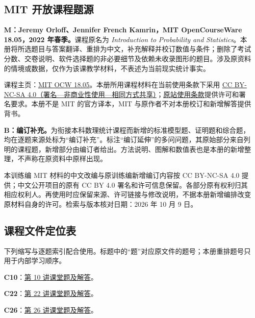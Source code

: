 \documentclass[UTF8,12pt,a4paper,fontset=fandol]{ctexbook}
\begin{document}
\subsection*{MIT 开放课程题源}
\textbf{M：Jeremy Orloff、Jennifer French Kamrin，MIT OpenCourseWare 18.05，2022 年春季。}课程原名为 \emph{Introduction to Probability and Statistics}。本册将所选题目与答案翻译、重排为中文，补充解释并校订数值与条件；删除了考试分数、交卷说明、软件选择题的非必要细节及依赖未收录图形的题目。涉及原资料的情境或数据，仅作为该课教学材料，不表述为当前现实统计事实。

课程主页：\href{https://ocw.mit.edu/courses/18-05-introduction-to-probability-and-statistics-spring-2022/}{MIT OCW 18.05}。本册所用课程材料在当前使用条款下采用 \href{https://creativecommons.org/licenses/by-nc-sa/4.0/}{CC BY-NC-SA 4.0（署名—非商业性使用—相同方式共享）}；\href{https://ocw.mit.edu/pages/privacy-and-terms-of-use/}{原站使用条款}提供许可和署名要求。本册不是 MIT 的官方译本，MIT 与原作者不对本册校订和新增解答提供背书。

\textbf{B：编订补充。}为衔接本科数理统计课程而新增的标准模型题、证明题和综合题，均在逐题来源处标为“编订补充”。标注“编订延伸”的多问问题，其原始部分来自列明的课程题，新增部分由编订者给出。方法说明、图解和数值表也是本册的新增整理，不声称在原资料中原样出现。

本训练编 MIT 材料的中文改编与原训练编新增编订内容按 CC BY-NC-SA 4.0 提供；中文公开项目的原有 CC BY 4.0 署名和许可信息保留。各部分原有权利归其相应权利人。再使用时应保留来源、许可链接与修改说明，不据本册新增编排改变原材料自身的许可。检索与版本核对日期：2026 年 10 月 9 日。

\subsection*{课程文件定位表}
下列缩写与逐题索引配合使用。标题中的“题”对应原文件的题号；本册重排题号只用于内部学习顺序。


\noindent\textbf{C10}：\href{https://ocw.mit.edu/courses/18-05-introduction-to-probability-and-statistics-spring-2022/mit18_05_s22_class10_pset_sol.pdf}{第 10 讲课堂题及解答}。\par

\noindent\textbf{C22}：\href{https://ocw.mit.edu/courses/18-05-introduction-to-probability-and-statistics-spring-2022/mit18_05_s22_class22_pset_sol.pdf}{第 22 讲课堂题及解答}。\par

\noindent\textbf{C26}：\href{https://ocw.mit.edu/courses/18-05-introduction-to-probability-and-statistics-spring-2022/mit18_05_s22_class26_pset_sol.pdf}{第 26 讲课堂题及解答}。\par
\end{document}

